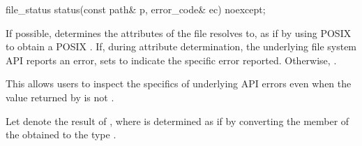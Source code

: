 %
\begin{itemdecl}
file_status status(const path& p, error_code& ec) noexcept;
\end{itemdecl}

\begin{itemdescr}
\pnum
\effects
If possible, determines the attributes
    of the file  resolves to, as if by using POSIX 
    to obtain a POSIX .
      If, during attribute determination, the underlying file system API reports
    an error, sets  to indicate the specific error reported.
    Otherwise, .
\begin{note} This allows users to inspect the specifics of underlying
      API errors even when the value returned by  is not
      . \end{note}

\pnum
Let  denote the result of ,
where  is determined as if by converting the  member
of the obtained  to the type .


\end{itemdescr}
